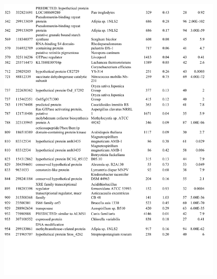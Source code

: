\begin{figure}[H]
\centering
    \includegraphics[width=1.0\textwidth]{./tex/chapter1/figures/supplemental/TableS1b.pdf}
\end{figure}
